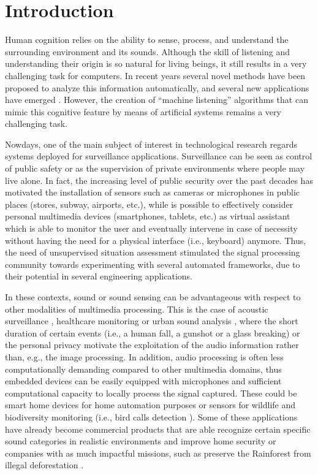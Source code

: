 \chapter{Introduction}\label{ch:intro}

Human cognition relies on the ability to sense, process, and understand the surrounding environment and its sounds.
Although the skill of listening and understanding their origin is so natural for living beings, it still results in a very challenging task for computers. In recent years several novel methods have been proposed to analyze this information automatically, and several new applications have emerged \cite{virtanen2018computational}. However, the creation of ``machine listening'' algorithms that can mimic this cognitive feature by means of artificial systems remains a very challenging task. 

Nowdays, one of the main subject of interest in technological research regards systems deployed for surveillance applications. Surveillance can be seen as control of public safety or as the supervision of private environments where people may live alone. 
In fact, the increasing level of public security over the past decades has motivated the installation of sensors such as cameras or microphones in public places (stores, subway, airports, etc.), while is possible to effectively consider personal multimedia devices (smartphones, tablets, etc.) as virtual assistant which is able to monitor the user and eventually intervene in case of necessity without having the need for a physical interface (i.e., keyboard) anymore.
Thus, the need of unsupervised situation assessment stimulated the signal processing community towards experimenting with several automated frameworks, due to their potential in several engineering applications.

In these contexts, sound or sound sensing can be advantageous with respect to other modalities of multimedia processing.
This is the case of acoustic surveillance \cite{crocco2016audio}, healthcare monitoring \cite{peng2009healthcare, foggia2015reliable} or urban sound analysis \cite{salamon2017deep}, where the short duration of certain events (i.e., a human fall, a gunshot or a glass breaking) or the personal privacy motivate the exploitation of the audio information rather than, e.g., the image processing. 
In addition, audio processing is often less computationally demanding compared to other multimedia domains, thus embedded devices can be easily equipped with microphones and sufficient computational capacity to locally process the signal captured. 
These could be smart home devices for home automation purposes or sensors for wildlife and biodiversity monitoring (i.e., bird calls detection \cite{grill2017two}). 
Some of these applications have already become commercial products that are able recognize certain specific sound
categories in realistic environments and improve home security \cite{audioanalytic}  or companies with as much impactful missions, such as preserve the Rainforest from illegal deforestation \cite{rainforest}.

